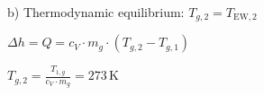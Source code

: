 b) Thermodynamic equilibrium: \( T_{g,2} = T_{\text{EW},2} \)  

\( \Delta h = Q = c_V \cdot m_g \cdot (T_{g,2} - T_{g,1}) \)  

\( T_{g,2} = \frac{T_{1,g}}{c_V \cdot m_g} = 273 \, \text{K} \)